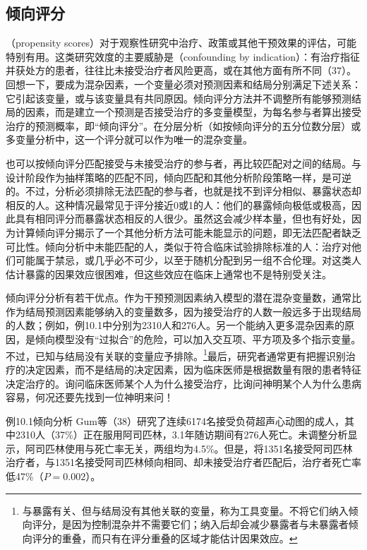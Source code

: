 \subsection{倾向评分}
（propensity scores）对于观察性研究中治疗、政策或其他干预效果的评估，可能特别有用。这类研究效度的主要威胁是（confounding by indication）：有治疗指征并获处方的患者，往往比未接受治疗者风险更高，或在其他方面有所不同（37）。回想一下，要成为混杂因素，一个变量必须对预测因素和结局分别满足下述关系：它引起该变量，或与该变量具有共同原因。倾向评分方法并不调整所有能够预测结局的因素，而是建立一个预测是否接受治疗的多变量模型，为每名参与者算出接受治疗的预测概率，即“倾向评分”。在分层分析（如按倾向评分的五分位数分层）或多变量分析中，这一个评分就可以作为唯一的混杂变量。

也可以按倾向评分匹配接受与未接受治疗的参与者，再比较匹配对之间的结局。与设计阶段作为抽样策略的匹配不同，倾向匹配和其他分析阶段策略一样，是可逆的。不过，分析必须排除无法匹配的参与者，也就是找不到评分相似、暴露状态却相反的人。这种情况最常见于评分接近0或1的人：他们的暴露倾向极低或极高，因此具有相同评分而暴露状态相反的人很少。虽然这会减少样本量，但也有好处，因为计算倾向评分揭示了一个其他分析方法可能未能显示的问题，即无法匹配者缺乏可比性。倾向分析中未能匹配的人，类似于符合临床试验排除标准的人：治疗对他们可能属于禁忌，或几乎必不可少，以至于随机分配到另一组不合伦理。对这类人估计暴露的因果效应很困难，但这些效应在临床上通常也不是特别受关注。

倾向评分分析有若干优点。作为干预预测因素纳入模型的潜在混杂变量数，通常比作为结局预测因素能够纳入的变量数多，因为接受治疗的人数一般远多于出现结局的人数；例如，例10.1中分别为2310人和276人。另一个能纳入更多混杂因素的原因，是倾向模型没有“过拟合”的危险，可以加入交互项、平方项及多个指示变量。不过，已知与结局没有关联的变量应予排除。\footnote{与暴露有关、但与结局没有其他关联的变量，称为工具变量。不将它们纳入倾向评分，是因为控制混杂并不需要它们；纳入后却会减少暴露者与未暴露者倾向评分的重叠，而只有在评分重叠的区域才能估计因果效应。}最后，研究者通常更有把握识别治疗的决定因素，而不是结局的决定因素，因为临床医师是根据数量有限的患者特征决定治疗的。询问临床医师某个人为什么接受治疗，比询问神明某个人为什么患病容易，何况还要先找到一位神明来问！

\begin{bookbox}{例10.1\quad 倾向分析}
Gum等（38）研究了连续6174名接受负荷超声心动图的成人，其中2310人（37\%）正在服用阿司匹林，3.1年随访期间有276人死亡。未调整分析显示，阿司匹林使用与死亡率无关，两组均为4.5\%。但是，将1351名接受阿司匹林治疗者，与1351名接受阿司匹林倾向相同、却未接受治疗者匹配后，治疗者死亡率低47\%（$P=0.002$）。
\end{bookbox}

